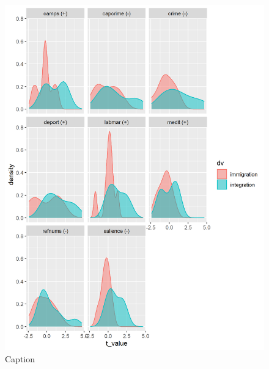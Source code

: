 \documentclass{article}
\begin{document}
\begin{figure}
    \centering
    \includegraphics[width = \textwidth]{paper/vis/t_values_noimp.png}
    \caption{Caption}
    \label{fig:t_values}
\end{figure}
\end{document}
